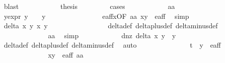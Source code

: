 \begin{isabellebody}
\ blast\isanewline
\ \ \ \ \ \ \ \ \isamarkupfalse%
\ \isamarkupfalse%
\ {\isacharquery}thesis\isanewline
\ \ \ \ \ \ \ \ \isamarkupfalse%
{\isacharparenleft}cases{\isacharparenright}\isanewline
\ \ \ \ \ \ \ \ \ \ \isamarkupfalse%
\ aa\isanewline
\ \ \ \ \ \ \ \ \ \ \isamarkupfalse%
\ y{\isacharunderscore}expr{\isacharcolon}\ {\isachardoublequoteopen}y{\isacharprime}\ {\isacharequal}\ {}\ {\isasymor}\ y{\isacharprime}\ {\isacharequal}\ {\isacharminus}{}{\isachardoublequoteclose}\isanewline
\ \ \ \ \ \ \ \ \ \ \ \ \isamarkupfalse%
\ e{\isacharunderscore}aff{\isacharunderscore}x{}{\isacharbrackleft}OF\ aa\ {\isacartoucheopen}{\isacharparenleft}x{\isacharprime}{\isacharcomma}y{\isacharprime}{\isacharparenright}\ {\isasymin}\ e{\isacharunderscore}aff{\isacartoucheclose}{\isacharbrackright}\ \isamarkupfalse%
\ simp\isanewline
\ \ \ \ \ \ \ \ \ \ \isamarkupfalse%
\ {\isachardoublequoteopen}delta\ x\ y\ x{\isacharprime}\ y{\isacharprime}\ {\isasymnoteq}\ {}{\isachardoublequoteclose}\ \isanewline
\ \ \ \ \ \ \ \ \ \ \ \ \isamarkupfalse%
\ delta{\isacharunderscore}def\ delta{\isacharunderscore}plus{\isacharunderscore}def\ delta{\isacharunderscore}minus{\isacharunderscore}def\isanewline
\ \ \ \ \ \ \ \ \ \ \ \ \isamarkupfalse%
\ aa\ \isamarkupfalse%
\ simp\isanewline
\ \ \ \ \ \ \ \ \ \ \isamarkupfalse%
\ d{\isacharunderscore}{}{\isacharunderscore}nz{\isacharcolon}\ {\isachardoublequoteopen}delta\ x\ y\ {}\ y{\isacharprime}\ {\isasymnoteq}\ {}{\isachardoublequoteclose}\ \isanewline
\ \ \ \ \ \ \ \ \ \ \ \ \isamarkupfalse%
\ delta{\isacharunderscore}def\ delta{\isacharunderscore}plus{\isacharunderscore}def\ delta{\isacharunderscore}minus{\isacharunderscore}def\ \isamarkupfalse%
\ auto\isanewline
\ \ \ \ \ \ \ \ \ \ \isamarkupfalse%
\ {\isachardoublequoteopen}{\isacharparenleft}{}{\isacharcomma}\ {}\ {\isacharslash}\ {\isacharparenleft}t\ {\isacharasterisk}\ y{\isacharprime}{\isacharparenright}{\isacharparenright}\ {\isasymnotin}\ e{\isacharunderscore}aff{\isachardoublequoteclose}\isanewline
\ \ \ \ \ \ \ \ \ \ \ \ \isamarkupfalse%
\ {\isacartoucheopen}{\isacharparenleft}x{\isacharprime}{\isacharcomma}y{\isacharprime}{\isacharparenright}\ {\isasymin}\ e{\isacharunderscore}aff{\isacartoucheclose}\ aa\ \isamarkupfalse%

\end{isabellebody}
